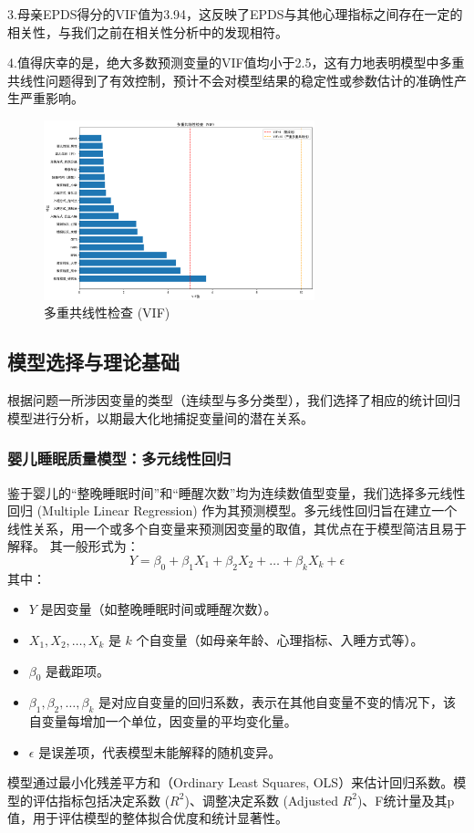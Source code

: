 \documentclass[withoutpreface,bwprint]{cumcmthesis}
\begin{document}
3.母亲EPDS得分的VIF值为3.94，这反映了EPDS与其他心理指标之间存在一定的相关性，与我们之前在相关性分析中的发现相符。

4.值得庆幸的是，绝大多数预测变量的VIF值均小于2.5，这有力地表明模型中多重共线性问题得到了有效控制，预计不会对模型结果的稳定性或参数估计的准确性产生严重影响。


\begin{figure}[htbp]
    \centering
    \includegraphics[width=0.7\textwidth]{figures/multicollinearity_vif.png}
    \caption{多重共线性检查 (VIF)}
    \label{fig:multicollinearity_vif}
\end{figure}

\subsection{模型选择与理论基础}
根据问题一所涉因变量的类型（连续型与多分类型），我们选择了相应的统计回归模型进行分析，以期最大化地捕捉变量间的潜在关系。

\subsubsection{婴儿睡眠质量模型：多元线性回归}
鉴于婴儿的“整晚睡眠时间”和“睡醒次数”均为连续数值型变量，我们选择多元线性回归 (Multiple Linear Regression) 作为其预测模型。多元线性回归旨在建立一个线性关系，用一个或多个自变量来预测因变量的取值，其优点在于模型简洁且易于解释。
其一般形式为：
$$ Y = \beta_0 + \beta_1 X_1 + \beta_2 X_2 + \dots + \beta_k X_k + \epsilon $$
其中：
\begin{itemize}
    \item $Y$ 是因变量（如整晚睡眠时间或睡醒次数）。
    \item $X_1, X_2, \dots, X_k$ 是 $k$ 个自变量（如母亲年龄、心理指标、入睡方式等）。
    \item $\beta_0$ 是截距项。
    \item $\beta_1, \beta_2, \dots, \beta_k$ 是对应自变量的回归系数，表示在其他自变量不变的情况下，该自变量每增加一个单位，因变量的平均变化量。
    \item $\epsilon$ 是误差项，代表模型未能解释的随机变异。
\end{itemize}
模型通过最小化残差平方和（Ordinary Least Squares, OLS）来估计回归系数。模型的评估指标包括决定系数 ($R^2$)、调整决定系数 (Adjusted $R^2$)、F统计量及其p值，用于评估模型的整体拟合优度和统计显著性。
\end{document}
